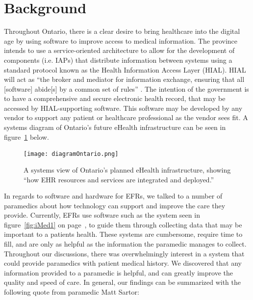 
\section{Background}

Throughout Ontario, there is a clear desire to bring healthcare into the digital age by using software to improve access to medical information. The province intends to use a service-oriented architecture to allow for the development of components (i.e. IAPs) that distribute information between systems using a standard protocol known as the Health Information Access Layer (HIAL). HIAL will act as ``the broker and mediator for information exchange, ensuring that all [software] abide[s] by a common set of rules'' \cite{b1}. The intention of the government is to have a comprehensive and secure electronic health record, that may be accessed by HIAL-supporting software. This software may be developed by any vendor to support any patient or healthcare professional as the vendor sees fit. A systems diagram of Ontario's future eHealth infrastructure can be seen in figure~\ref{fig:eHealth1} below.


\begin{figure}[h]
  \centering
  \texttt{[image: diagramOntario.png]}
  \captionsetup{format=hang}
  \caption[Ontario eHealth Systems View]{A systems view of Ontario's planned eHealth infrastructure, showing ``how EHR resources and services are integrated and deployed.'' \cite{b1}}
  \label{fig:eHealth1}
\end{figure}

In regards to software and hardware for EFRs, we talked to a number of paramedics about how technology can support and improve the care they provide. Currently, EFRs use software such as the system seen in figure~\ref{fig:iMed1} on page~\pageref{fig:iMed1}, to guide them through collecting data that may be important to a patients health. These systems are cumbersome, require time to fill, and are only as helpful as the information the paramedic manages to collect. Throughout our discussions, there was overwhelmingly interest in a system that could provide paramedics with patient medical history. We discovered that any information provided to a paramedic is helpful, and can greatly improve the quality and speed of care. In general, our findings can be summarized with the following quote from paramedic Matt Sartor:

